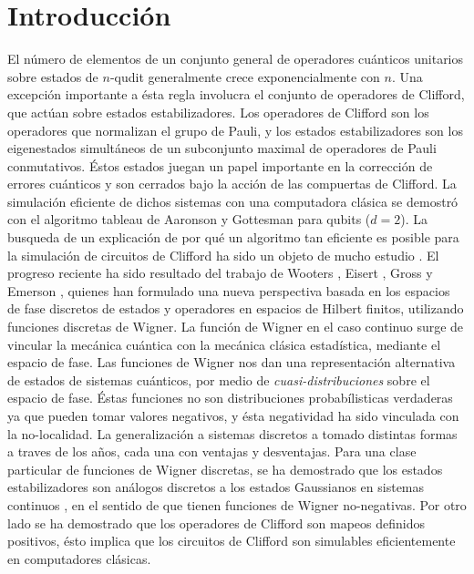 \documentclass[a4paper,11pt]{report}
\begin{document}
  
  
  

  \tableofcontents

  \newpage
  \section{Introducción}

  El número de elementos de un conjunto general de
  operadores cuánticos unitarios sobre estados de $n$-qudit
  generalmente crece exponencialmente con $n$. Una excepción
  importante a ésta regla involucra el conjunto de
  operadores de Clifford, que actúan sobre estados
  estabilizadores. Los operadores de Clifford son los
  operadores que normalizan el grupo de Pauli, y los
  estados estabilizadores son los eigenestados simultáneos
  de un subconjunto maximal de operadores de Pauli
  conmutativos. Éstos estados juegan un papel importante
  en la corrección de errores cuánticos \cite{gottesman1998}
  y son cerrados bajo la acción de las compuertas de
  Clifford. La simulación eficiente de dichos sistemas con
  una computadora clásica se demostró con el algoritmo
  tableau de Aaronson y Gottesman \cite{aaronson2004,
  gottesman1998} para qubits ($d=2$). La busqueda de un
  explicación de por qué un algoritmo tan eficiente es
  posible para la simulación de circuitos de Clifford ha
  sido un objeto de mucho estudio \cite{gottesman1999,
  howard2014, mari2012}. El progreso reciente ha sido
  resultado del trabajo de Wooters \cite{wootters1987},
  Eisert \cite{mari2012}, Gross \cite{gross2006} y Emerson
  \cite{howard2014}, quienes han formulado una nueva
  perspectiva basada en los espacios de fase discretos de
  estados y operadores en espacios de Hilbert finitos,
  utilizando funciones discretas de Wigner.  La función de
  Wigner en el caso continuo surge de vincular la mecánica
  cuántica con la mecánica clásica estadística, mediante el
  espacio de fase. Las funciones de Wigner nos dan una
  representación alternativa de estados de sistemas
  cuánticos, por medio de \textit{cuasi-distribuciones}
  sobre el espacio de fase. Éstas funciones no son
  distribuciones probabílisticas verdaderas ya que pueden
  tomar valores negativos, y ésta negatividad ha sido
  vinculada con la no-localidad. La generalización a
  sistemas discretos a tomado distintas formas a traves de
  los años, cada una con ventajas y desventajas. Para una
  clase particular de funciones de Wigner discretas, se ha
  demostrado que los estados estabilizadores son análogos
  discretos a los estados Gaussianos en sistemas continuos
  \cite{gross2006}, en el sentido de que tienen funciones de
  Wigner no-negativas. Por otro lado se ha demostrado
  que los operadores de Clifford son mapeos definidos
  positivos, ésto implica que los circuitos de Clifford son
  simulables eficientemente en computadores clásicas.
\end{document}
